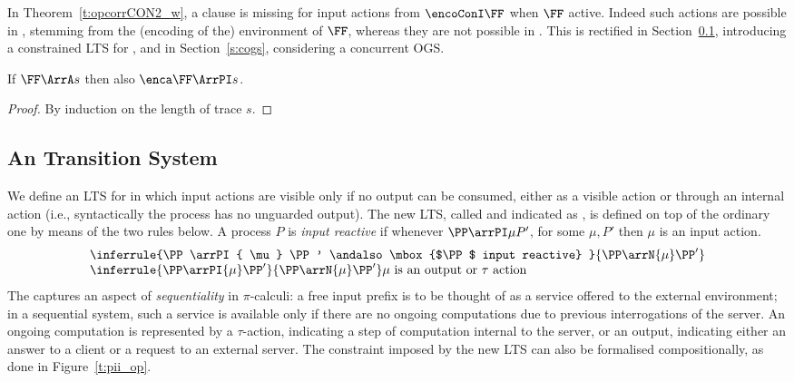 

In Theorem~\ref{t:opcorrCON2_w}, a  clause is 
 missing
 for
input actions from $ \encoConI \FF$ when 
 $\FF$ active. Indeed such actions are possible in \piI, stemming from the (encoding of
 the) environment of $\FF$, whereas they are not possible in \AOGS. This is rectified in
 Section~\ref{subsec:seq-ts-pi}, introducing a constrained LTS for \piI, and in Section~\ref{s:cogs}, 
 considering a concurrent OGS.   
 
\begin{corollary}
\label{c:tracesGSpi}
If $\FF \ArrA s$ then also $ \enca \FF \ArrPI s $.
\end{corollary} 

\begin{proof}
By induction on the length of trace $s$.
\end{proof} 

\subsection{An \outputpr Transition System}
\label{subsec:seq-ts-pi}

We define an LTS for \piI in which input actions are
visible only if no output can be consumed, 
either as a  visible action or through an internal action 
(i.e., syntactically the process has no unguarded output). 
The new LTS, called \emph{\outputpr} and indicated as \opLTS,  
is defined on top of the ordinary one 
by means of the two rules below. A process $P$ is \emph{input reactive} if 
whenever $\PP \arrPI \mu  P'$, for some $\mu,P'$ 
 then  $\mu$ is an input action.
 \[
\begin{array}{l}
  \inferrule{\PP \arrPI{ \mu} \PP' \andalso  
  \mbox{$\PP$ input reactive}
 }{\PP \arrN {\mu} \PP'}
\\
  \inferrule{\PP \arrPI{ \mu} \PP'
 }{\PP \arrN {\mu} \PP'}
\mbox{$\mu$ is an output or $\tau$  action}
\end{array}
 \]
The \opLTS captures an aspect of   \emph{sequentiality} 
in  $\pi$-calculi:  
a  free input prefix  is to be  thought of as a service offered to the external environment; 
in a sequential system, such a service is available only if 
there are no ongoing computations due to previous interrogations of the server. 
An ongoing computation is represented by  
a $\tau$-action, indicating a step  of computation  internal to the server, or 
an output, indicating either an answer to a client  or a request to an
external server.  
The constraint imposed by the 
new LTS can also be formalised compositionally,
as done in Figure~\ref{t:pii_op}.


